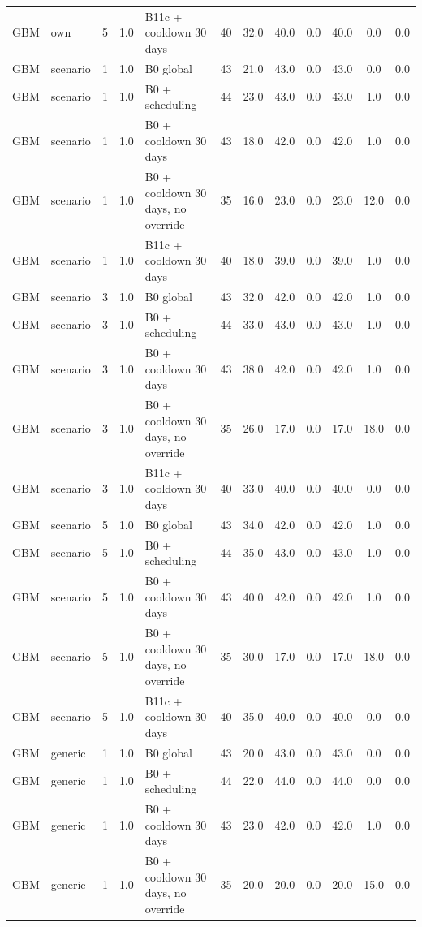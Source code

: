 \begin{longtable}{lllllccccccc}
GBM & own & 5 & 1.0 & B11c + cooldown 30 days & 40 & 32.0 & 40.0 & 0.0 & 40.0 & 0.0 & 0.0 \\
GBM & scenario & 1 & 1.0 & B0 global & 43 & 21.0 & 43.0 & 0.0 & 43.0 & 0.0 & 0.0 \\
GBM & scenario & 1 & 1.0 & B0 + scheduling & 44 & 23.0 & 43.0 & 0.0 & 43.0 & 1.0 & 0.0 \\
GBM & scenario & 1 & 1.0 & B0 + cooldown 30 days & 43 & 18.0 & 42.0 & 0.0 & 42.0 & 1.0 & 0.0 \\
GBM & scenario & 1 & 1.0 & B0 + cooldown 30 days, no override & 35 & 16.0 & 23.0 & 0.0 & 23.0 & 12.0 & 0.0 \\
GBM & scenario & 1 & 1.0 & B11c + cooldown 30 days & 40 & 18.0 & 39.0 & 0.0 & 39.0 & 1.0 & 0.0 \\
GBM & scenario & 3 & 1.0 & B0 global & 43 & 32.0 & 42.0 & 0.0 & 42.0 & 1.0 & 0.0 \\
GBM & scenario & 3 & 1.0 & B0 + scheduling & 44 & 33.0 & 43.0 & 0.0 & 43.0 & 1.0 & 0.0 \\
GBM & scenario & 3 & 1.0 & B0 + cooldown 30 days & 43 & 38.0 & 42.0 & 0.0 & 42.0 & 1.0 & 0.0 \\
GBM & scenario & 3 & 1.0 & B0 + cooldown 30 days, no override & 35 & 26.0 & 17.0 & 0.0 & 17.0 & 18.0 & 0.0 \\
GBM & scenario & 3 & 1.0 & B11c + cooldown 30 days & 40 & 33.0 & 40.0 & 0.0 & 40.0 & 0.0 & 0.0 \\
GBM & scenario & 5 & 1.0 & B0 global & 43 & 34.0 & 42.0 & 0.0 & 42.0 & 1.0 & 0.0 \\
GBM & scenario & 5 & 1.0 & B0 + scheduling & 44 & 35.0 & 43.0 & 0.0 & 43.0 & 1.0 & 0.0 \\
GBM & scenario & 5 & 1.0 & B0 + cooldown 30 days & 43 & 40.0 & 42.0 & 0.0 & 42.0 & 1.0 & 0.0 \\
GBM & scenario & 5 & 1.0 & B0 + cooldown 30 days, no override & 35 & 30.0 & 17.0 & 0.0 & 17.0 & 18.0 & 0.0 \\
GBM & scenario & 5 & 1.0 & B11c + cooldown 30 days & 40 & 35.0 & 40.0 & 0.0 & 40.0 & 0.0 & 0.0 \\
GBM & generic & 1 & 1.0 & B0 global & 43 & 20.0 & 43.0 & 0.0 & 43.0 & 0.0 & 0.0 \\
GBM & generic & 1 & 1.0 & B0 + scheduling & 44 & 22.0 & 44.0 & 0.0 & 44.0 & 0.0 & 0.0 \\
GBM & generic & 1 & 1.0 & B0 + cooldown 30 days & 43 & 23.0 & 42.0 & 0.0 & 42.0 & 1.0 & 0.0 \\
GBM & generic & 1 & 1.0 & B0 + cooldown 30 days, no override & 35 & 20.0 & 20.0 & 0.0 & 20.0 & 15.0 & 0.0 \\

\end{longtable}
